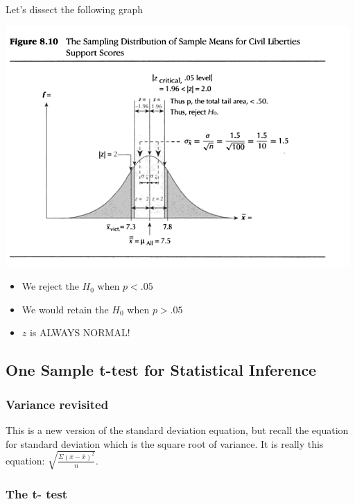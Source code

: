 \documentclass[]{article}
\begin{document}
Let's dissect the following graph

\includegraphics{one_samp_z_clib.png}

\begin{itemize}
\item
  We reject the $H_0$ when $p < .05$
\item
  We would retain the $H_0$ when $p > .05$
\item
  $z$ is ALWAYS NORMAL!
\end{itemize}

\subsection{One Sample t-test for Statistical
Inference}\label{one-sample-t-test-for-statistical-inference}

\subsubsection{Variance revisited}\label{variance-revisited}

This is a new version of the standard deviation equation, but recall the
equation for standard deviation which is the square root of variance. It
is really this equation: $\sqrt{\frac{\Sigma (x-\bar{x})^2}{n}}$.

\subsubsection{The t- test}\label{the-t--test}
\end{document}
